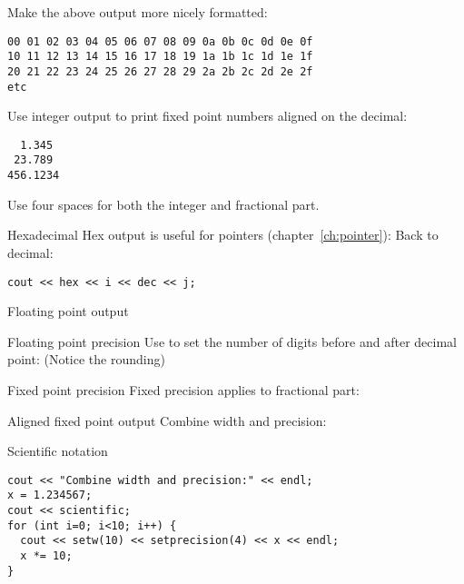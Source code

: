\begin{exercise}
  \label{ex:leadzero}
  Make the above output more nicely formatted:
\begin{verbatim}
00 01 02 03 04 05 06 07 08 09 0a 0b 0c 0d 0e 0f 
10 11 12 13 14 15 16 17 18 19 1a 1b 1c 1d 1e 1f 
20 21 22 23 24 25 26 27 28 29 2a 2b 2c 2d 2e 2f 
etc
\end{verbatim}
\end{exercise}

\begin{exercise}
  \label{ex:fixedpout}
  Use integer output to print fixed point numbers aligned on the
  decimal:
\begin{verbatim}
  1.345
 23.789
456.1234
\end{verbatim}
  Use four spaces for both the integer and fractional part.
\end{exercise}

\begin{block}{Hexadecimal}
  \label{sl:io-hex}
  Hex output is useful for pointers (chapter~\ref{ch:pointer}):
  Back to decimal:
\begin{verbatim}
cout << hex << i << dec << j;
\end{verbatim}
\end{block}

 {Floating point output}

\begin{block}{Floating point precision}
  \label{sl:io-float}
  Use  to set the number of digits before and after
  decimal point:
  (Notice the rounding)
\end{block}

\begin{block}{Fixed point precision}
  \label{sl:io-fix}
  Fixed precision applies to fractional part:
\end{block}

\begin{block}{Aligned fixed point output}
  \label{sl:io-align}
  Combine width and precision:
\end{block}

\begin{block}{Scientific notation}
  \label{sl:io-sci}
\begin{verbatim}
cout << "Combine width and precision:" << endl;
x = 1.234567;
cout << scientific;
for (int i=0; i<10; i++) {
  cout << setw(10) << setprecision(4) << x << endl;
  x *= 10;
}
\end{verbatim}
\end{block}

